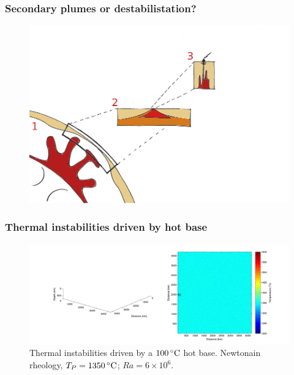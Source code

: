 \documentclass[aspectratio=169]{beamer}
\begin{document}
\begin{frame}
    \frametitle{Secondary plumes or destabilistation?}
    \begin{figure}
        \includegraphics[height=0.9\paperheight]{./pictures/drawing.png}
    \end{figure}
\end{frame}

\begin{frame}
    \frametitle{Thermal instabilities driven by hot base}
    \begin{figure}
        \vspace{-.5cm}
        \includegraphics[width=0.85\paperwidth]{./figures/Newt100/dT1.0741_4x4_Newt_Ra6e6_0.png}
        \caption{Thermal instabilities driven by a $100\rm\,^{\circ}C$ hot base. Newtonain rheology, $T_{P}=1350\rm\,^{\circ}C$; $Ra = 6\times10^{6}$.}
    \end{figure}
\end{frame}
\end{document}
